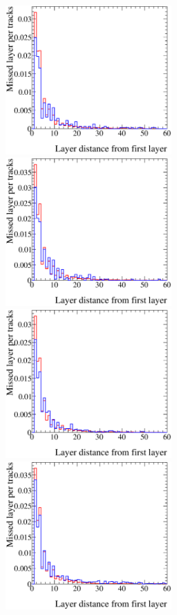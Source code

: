 \begin{figure}
\centering
\includegraphics[width=2.5in]{Figures/layerEff-5F5E-Run1-ccinc-DoMC-MissedLayerPerTracks.eps}
\includegraphics[width=2.5in]{Figures/layerEff-5F5E-Run2air-ccinc-DoMC-MissedLayerPerTracks.eps}
\includegraphics[width=2.5in]{Figures/layerEff-5F5E-Run2-ccinc-DoMC-MissedLayerPerTracks.eps}
\includegraphics[width=2.5in]{Figures/layerEff-5F5E-Run3air-ccinc-DoMC-MissedLayerPerTracks.eps}

\end{figure}
